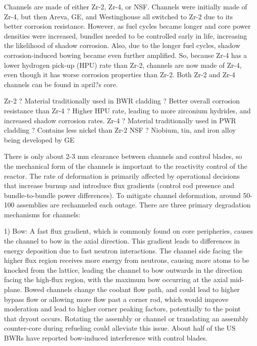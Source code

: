 \documentclass[10pt]{article}
\begin{document}
Channels are made of either Zr-2, Zr-4, or NSF. Channels were initially made of Zr-4, but then Areva, GE, and Westinghouse all switched to Zr-2 due to its better corrosion resistance. However, as fuel cycles became longer and core power densities were increased, bundles needed to be controlled early in life, increasing the likelihood of shadow corrosion. Also, due to the longer fuel cycles, shadow corrosion-induced bowing became even further amplified. So, because Zr-4 has a lower hydrogen pick-up (HPU) rate than Zr-2, channels are now made of Zr-4, even though it has worse corrosion properties than Zr-2. Both Zr-2 and Zr-4 channels can be found in april?s core.  

Zr-2
?	Material traditionally used in BWR cladding
?	Better overall corrosion resistance than Zr-4
?	Higher HPU rate, leading to more zirconium hydrides, and increased shadow corrosion rates.
Zr-4
?	Material traditionally used in PWR cladding
?	Contains less nickel than Zr-2
NSF
?	Niobium, tin, and iron alloy being developed by GE

There is only about 2-3 mm clearance between channels and control blades, so the mechanical form of the channels is important to the reactivity control of the reactor. The rate of deformation is primarily affected by operational decisions that increase burnup and introduce flux gradients (control rod presence and bundle-to-bundle power differences). To mitigate channel deformation, around 50-100 assemblies are rechanneled each outage. There are three primary degradation mechanisms for channels:

1)	Bow: A fast flux gradient, which is commonly found on core peripheries, causes the channel to bow in the axial direction. This gradient leads to differences in energy deposition due to fast neutron interactions. The channel side facing the higher flux region receives more energy from neutrons, causing more atoms to be knocked from the lattice, leading the channel to bow outwards in the direction facing the high-flux region, with the maximum bow occurring at the axial mid-plane. Bowed channels change the coolant flow path, and could lead to higher bypass flow or allowing more flow past a corner rod, which would improve moderation and lead to higher corner peaking factors, potentially to the point that dryout occurs. Rotating the assembly or channel or translating an assembly counter-core during refueling could alleviate this issue. About half of the US BWRs have reported bow-induced interference with control blades. 
\end{document}
